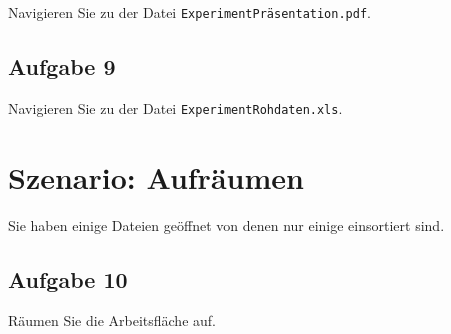 \documentclass[12pt,]{article}
\begin{document}
Navigieren Sie zu der Datei \texttt{ExperimentPräsentation.pdf}.

\newpage

\subsection{Aufgabe 9}

Navigieren Sie zu der Datei \texttt{ExperimentRohdaten.xls}.

\newpage

\section{Szenario: Aufräumen}

Sie haben einige Dateien geöffnet von denen nur einige einsortiert sind.

\subsection{Aufgabe 10}

Räumen Sie die Arbeitsfläche auf.
\end{document}
